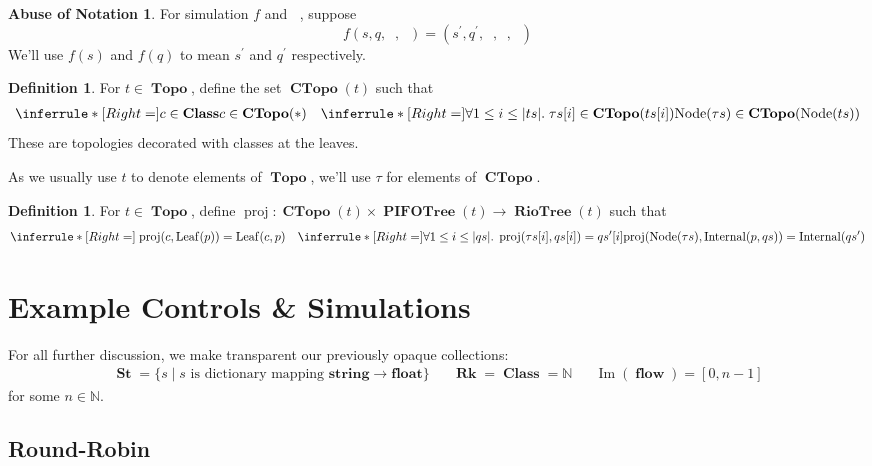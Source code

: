 \documentclass{amsart}
\DeclareMathOperator{\Ima}{Im}
\newcommand{\inference}[3]{\inferrule*[Right=#1]{#2}{#3}}
\newcommand{\axiom}[2]{\inferrule*[Right=#1]{\;}{#2}}
\DeclareMathOperator{\proj}{\mathrm{proj}}
\DeclareMathOperator{\Rk}{\mathbf{Rk}}
\DeclareMathOperator{\Topo}{\mathbf{Topo}}
\DeclareMathOperator{\PIFOTree}{\mathbf{PIFOTree}}
\DeclareMathOperator{\Leaf}{\mathrm{Leaf}}
\DeclareMathOperator{\Internal}{\mathrm{Internal}}
\DeclareMathOperator{\Node}{\mathrm{Node}}
\DeclareMathOperator{\St}{\mathbf{St}}
\DeclareMathOperator{\Class}{\mathbf{Class}}
\DeclareMathOperator{\flow}{\mathbf{flow}}
\DeclareMathOperator{\CTopo}{\textbf{CTopo}}
\DeclareMathOperator{\RioTree}{\mathbf{RioTree}}
\DeclareMathOperator{\zprepush}{z_{\mathrm{pre-push}}}
\DeclareMathOperator{\zprepop}{z_{\mathrm{pre-pop}}}
\DeclareMathOperator{\zpostpop}{z_{\mathrm{post-pop}}}
\DeclareMathOperator{\cinit}{c_{\text{init}}}
\theoremstyle{definition}
\newtheorem{dfn}[thm]{Definition}
\newtheorem{abuse}[thm]{Abuse of Notation}
\begin{document}
\begin{abuse}
    For simulation $f$ and $\cinit$, suppose 
    $$f(s, q, \zprepush, \zpostpop) = (s^\prime, q^\prime, \zprepush, \zprepop, \zpostpop)$$
    We'll use $f(s)$ and $f(q)$ to mean $s^\prime$ and $q^\prime$ respectively.
\end{abuse}

\begin{dfn}
    For $t \in \Topo$, define the set $\CTopo(t)$ such that
    \begin{align*}
        \inference{}
        {c \in \Class}
        {c \in \CTopo(\ast)}
        &&
        \inference{}
        {\forall 1 \leq i \leq |ts|. \; \tau s[i] \in \CTopo(ts[i])}
        {\Node(\tau s) \in \CTopo(\Node(ts))}
    \end{align*}
    These are topologies decorated with classes at the leaves.
\end{dfn}

As we usually use $t$ to denote elements of $\Topo$, we'll use $\tau$ for elements of $\CTopo$.

\begin{dfn}
    For $t \in \Topo$, define $\proj: \CTopo(t) \times \PIFOTree(t) \to \RioTree(t)$ such that
    \begin{align*}
        \axiom{}
        {\proj(c, \Leaf(p)) = \Leaf(c, p)}
        &&
        \inference{}
        {\forall 1 \leq i \leq |qs|. \; \proj(\tau s[i], qs[i]) = qs^\prime[i]}
        {\proj(\Node(\tau s), \Internal(p, qs)) = \Internal(qs^\prime)}
    \end{align*}
\end{dfn}

\newpage

\section{Example Controls \& Simulations}

For all further discussion, we make transparent our previously opaque collections:
\begin{align*}
    \St = \{s \mid s \text{ is dictionary mapping } \textbf{string} \to \textbf{float}\} &&
    \Rk = \Class = \mathbb N &&
    \Ima(\flow) = [0, n - 1]
\end{align*}
for some $n \in \mathbb N$.

\subsection{Round-Robin}
\end{document}
